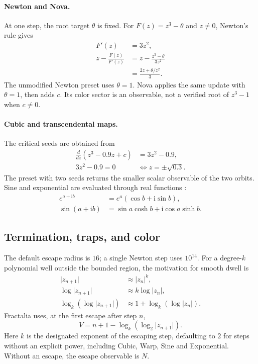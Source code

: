 \documentclass[11pt,a4paper]{article}
\numberwithin{equation}{section}
\newcommand{\abs}[1]{\lvert#1\rvert}
\newcommand{\ii}{\mathrm{i}}
\begin{document}
\paragraph{Newton and Nova.}
At one step, the root target \(\theta\) is fixed. For
\(F(z)=z^3-\theta\) and \(z\ne0\), Newton's rule \cite{hubbard} gives
\begin{align*}
  F'(z)&=3z^2,\\
  z-\frac{F(z)}{F'(z)}
    &=z-\frac{z^3-\theta}{3z^2}\\
    &=\frac{2z+\theta/z^2}{3}.
\end{align*}
The unmodified Newton preset uses \(\theta=1\). Nova applies the same
update with \(\theta=1\), then adds \(c\). Its color sector is an
observable, not a verified root of \(z^3-1\) when \(c\ne0\).

\paragraph{Cubic and transcendental maps.}
The critical seeds are obtained from
\begin{align*}
  \frac{d}{dz}(z^3-0.9z+c)&=3z^2-0.9,\\
  3z^2-0.9=0&\iff z=\pm\sqrt{0.3}.
\end{align*}
The preset with two seeds returns the smaller scalar observable of the two
orbits. Sine and exponential are evaluated through real functions
\cite{dlmf}:
\begin{align}
  e^{a+\ii b}&=e^a(\cos b+\ii\sin b),\\
  \sin(a+\ii b)&=\sin a\cosh b+\ii\cos a\sinh b.
\end{align}

\subsection{Termination, traps, and color}

The default escape radius is \(16\); a single Newton step uses \(10^{14}\).
For a degree-\(k\) polynomial well outside the bounded region, the
motivation for smooth dwell \cite{vepstas} is
\begin{align*}
  \abs{z_{n+1}}&\approx\abs{z_n}^{k},\\
  \log\abs{z_{n+1}}&\approx k\log\abs{z_n},\\
  \log_k(\log\abs{z_{n+1}})&\approx
     1+\log_k(\log\abs{z_n}).
\end{align*}
Fractalia uses, at the first escape after step \(n\),
\begin{equation}
  V=n+1-\log_k(\log_2\abs{z_{n+1}}).
\end{equation}
Here \(k\) is the designated exponent of the escaping step, defaulting
to \(2\) for steps without an explicit power, including Cubic, Warp,
Sine and Exponential. Without an escape, the escape observable is \(N\).
\end{document}
